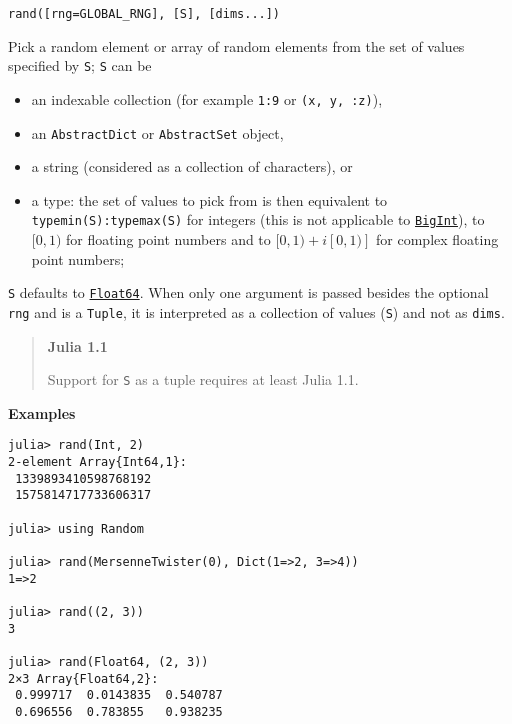 \begin{adjustwidth}{2em}{0pt}


\begin{verbatim}
rand([rng=GLOBAL_RNG], [S], [dims...])
\end{verbatim}

Pick a random element or array of random elements from the set of values specified by \texttt{S}; \texttt{S} can be

\begin{itemize}
\item an indexable collection (for example \texttt{1:9} or \texttt{({\textquotesingle}x{\textquotesingle}, {\textquotedbl}y{\textquotedbl}, :z)}),


\item an \texttt{AbstractDict} or \texttt{AbstractSet} object,


\item a string (considered as a collection of characters), or


\item a type: the set of values to pick from is then equivalent to \texttt{typemin(S):typemax(S)} for integers (this is not applicable to \hyperlink{423405808990690832}{\texttt{BigInt}}), to \([0, 1)\) for floating point numbers and to \([0, 1)+i[0, 1)]\) for complex floating point numbers;

\end{itemize}
\texttt{S} defaults to \hyperlink{5027751419500983000}{\texttt{Float64}}. When only one argument is passed besides the optional \texttt{rng} and is a \texttt{Tuple}, it is interpreted as a collection of values (\texttt{S}) and not as \texttt{dims}.

\begin{quote}
\textbf{Julia 1.1}

Support for \texttt{S} as a tuple requires at least Julia 1.1.

\end{quote}
\textbf{Examples}


\begin{verbatim}
julia> rand(Int, 2)
2-element Array{Int64,1}:
 1339893410598768192
 1575814717733606317

julia> using Random

julia> rand(MersenneTwister(0), Dict(1=>2, 3=>4))
1=>2

julia> rand((2, 3))
3

julia> rand(Float64, (2, 3))
2×3 Array{Float64,2}:
 0.999717  0.0143835  0.540787
 0.696556  0.783855   0.938235
\end{verbatim}


\end{adjustwidth}
